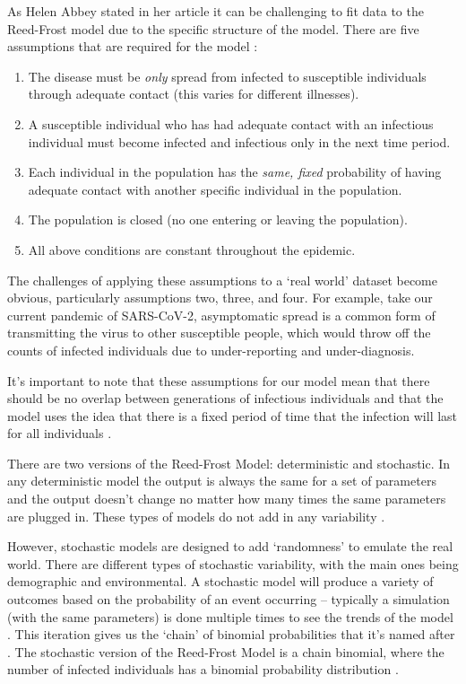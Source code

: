 As Helen Abbey stated in her article it can be challenging to fit data to the Reed-Frost model due to the specific structure of the model. There are five assumptions that are required for the model \cite{abbey}: 
\begin{enumerate}

\item{The disease must be \emph{only} spread from infected to susceptible individuals through adequate contact (this varies for different illnesses).}
\item{A susceptible individual who has had adequate contact with an infectious individual must become infected and infectious only in the next time period.}
\item{Each individual in the population has the \emph{same, fixed} probability of having adequate contact with another specific individual in the population.}
\item{The population is closed (no one entering or leaving the population).}
\item{All above conditions are constant throughout the epidemic.}

\end{enumerate}

The challenges of applying these assumptions to a ‘real world’ dataset become obvious, particularly assumptions two, three, and four. For example, take our current pandemic of SARS-CoV-2, asymptomatic spread is a common form of transmitting the virus to other susceptible people, which would throw off the counts of infected individuals due to under-reporting and under-diagnosis. 

It’s important to note that these assumptions for our model mean that there should be no overlap between generations of infectious individuals and that the model uses the idea that there is a fixed period of time that the infection will last for all individuals \cite{borchering}.

There are two versions of the Reed-Frost Model: deterministic and stochastic. In any deterministic model the output is always the same for a set of parameters and the output doesn’t change no matter how many times the same parameters are plugged in. These types of models do not add in any variability \cite{halloran}. 

However, stochastic models are designed to add ‘randomness’ to emulate the real world. There are different types of stochastic variability, with the main ones being demographic and environmental. A stochastic model will produce a variety of outcomes based on the probability of an event occurring – typically a simulation (with the same parameters) is done multiple times to see the trends of the model \cite{mark}. This iteration gives us the ‘chain’ of binomial probabilities that it’s named after \cite{borchering}.  The stochastic version of the Reed-Frost Model is a chain binomial, where the number of infected individuals has a binomial probability distribution \cite{halloran}. 